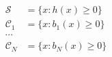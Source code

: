 \documentclass[preview]{standalone}
\begin{document}
\begin{align*}
\mathcal{S} &= \{ x : h(x) \geq 0 \}\\ \mathcal{C}_1 &= \{ x : b_1(x) \geq 0 \}\\ \cdots\\ \mathcal{C}_N &= \{ x : b_N(x) \geq 0 \}
\end{align*}
\end{document}
